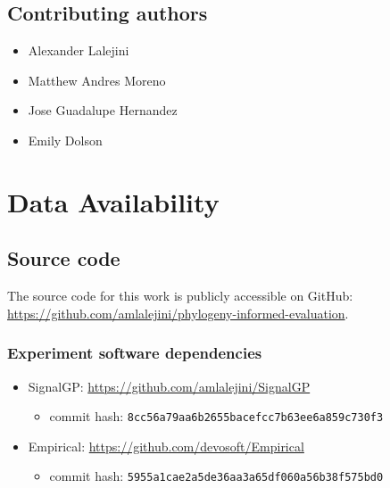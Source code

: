 \documentclass[
]{book}
\providecommand{\tightlist}{%
  \setlength{\itemsep}{0pt}\setlength{\parskip}{0pt}}
\begin{document}
\hypertarget{contributing-authors}{%
\section{Contributing authors}\label{contributing-authors}}

\begin{itemize}
\tightlist
\item
  Alexander Lalejini
\item
  Matthew Andres Moreno
\item
  Jose Guadalupe Hernandez
\item
  Emily Dolson
\end{itemize}

\hypertarget{data-availability}{%
\chapter{Data Availability}\label{data-availability}}

\hypertarget{source-code}{%
\section{Source code}\label{source-code}}

The source code for this work is publicly accessible on GitHub: \url{https://github.com/amlalejini/phylogeny-informed-evaluation}.

\hypertarget{experiment-software-dependencies}{%
\subsection{Experiment software dependencies}\label{experiment-software-dependencies}}

\begin{itemize}
\tightlist
\item
  SignalGP: \url{https://github.com/amlalejini/SignalGP}

  \begin{itemize}
  \tightlist
  \item
    commit hash: \texttt{8cc56a79aa6b2655bacefcc7b63ee6a859c730f3}
  \end{itemize}
\item
  Empirical: \url{https://github.com/devosoft/Empirical}

  \begin{itemize}
  \tightlist
  \item
    commit hash: \texttt{5955a1cae2a5de36aa3a65df060a56b38f575bd0}
  \end{itemize}
\end{itemize}
\end{document}
